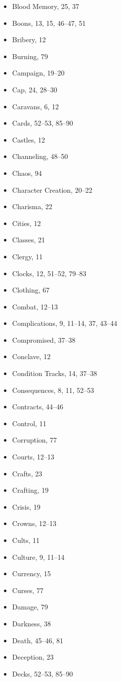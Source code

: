 \begin{multicols}{2}
\begin{itemize}
  \item Blood Memory, 25, 37
  \item Boons, 13, 15, 46--47, 51
  \item Bribery, 12
  \item Burning, 79
  \item Campaign, 19--20
  \item Cap, 24, 28--30
  \item Caravans, 6, 12
  \item Cards, 52--53, 85--90
  \item Castles, 12
  \item Channeling, 48--50
  \item Chaos, 94
  \item Character Creation, 20--22
  \item Charisma, 22
  \item Cities, 12
  \item Classes, 21
  \item Clergy, 11
  \item Clocks, 12, 51--52, 79--83
  \item Clothing, 67
  \item Combat, 12--13
  \item Complications, 9, 11--14, 37, 43--44
  \item Compromised, 37--38
  \item Conclave, 12
  \item Condition Tracks, 14, 37--38
  \item Consequences, 8, 11, 52--53
  \item Contracts, 44--46
  \item Control, 11
  \item Corruption, 77
  \item Courts, 12--13
  \item Crafts, 23
  \item Crafting, 19
  \item Crisis, 19
  \item Crowns, 12--13
  \item Cults, 11
  \item Culture, 9, 11--14
  \item Currency, 15
  \item Curses, 77
  \item Damage, 79
  \item Darkness, 38
  \item Death, 45--46, 81
  \item Deception, 23
  \item Decks, 52--53, 85--90

\end{itemize}
\end{multicols}
